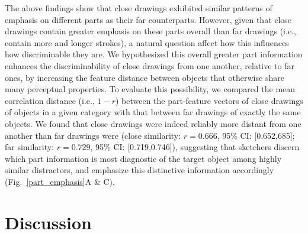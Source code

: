 \documentclass[10pt,letterpaper]{article}
\newcommand{\jefan}[1]{{\color{blue}{[jefan: #1]}}}
\begin{document}
The above findings show that close drawings exhibited similar patterns of emphasis on different parts as their far counterparts. 
However, given that close drawings contain greater emphasis on these parts overall than far drawings (i.e., contain more and longer strokes), a natural question affect how this influences how discriminable they are.
\jefan{Kushin, I think we should report the basic observation that close drawings consist of more strokes and higher arclengths than far, with CIs, around here.}
We hypothesized this overall greater part information enhances the discriminability of close drawings from one another, relative to far ones, by increasing the feature distance between objects that otherwise share many perceptual properties. 
To evaluate this possibility, we compared the mean correlation distance (i.e., $1 - r$) between the part-feature vectors of close drawings of objects in a given category with that between far drawings of exactly the same objects. 
We found that close drawings were indeed reliably more distant from one another than far drawings were (close similarity: $r = 0.666$, 95\% CI: [0.652,685]; far similarity: $r = 0.729$, 95\% CI: [0.719,0.746]), suggesting that sketchers discern which part information is most diagnostic of the target object among highly similar distractors, and emphasize this distinctive information accordingly (Fig.~\ref{part_emphasis}A \& C).

\section{Discussion}




\end{document}

